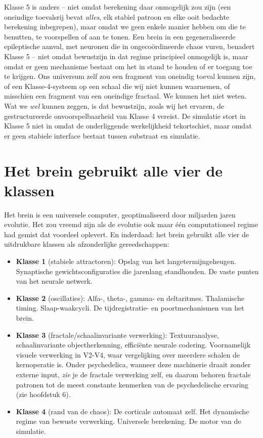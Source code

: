 \documentclass[11pt, twoside, openright]{book}
\begin{document}
Klasse 5 is anders -- niet omdat berekening daar onmogelijk zou zijn (een oneindige toevalsrij bevat \textit{alles}, elk stabiel patroon en elke ooit bedachte berekening inbegrepen), maar omdat we geen enkele manier hebben om die te benutten, te voorspellen of aan te tonen. Een brein in een gegeneraliseerde epileptische aanval, met neuronen die in ongecoördineerde chaos vuren, benadert Klasse 5 -- niet omdat bewustzijn in dat regime principieel onmogelijk is, maar omdat er geen mechanisme bestaat om het in stand te houden of er toegang toe te krijgen. Ons universum zelf zou een fragment van oneindig toeval kunnen zijn, of een Klasse-4-systeem op een schaal die wij niet kunnen waarnemen, of misschien een fragment van een oneindige fractaal. We kunnen het niet weten. Wat we \textit{wel} kunnen zeggen, is dat bewustzijn, zoals wij het ervaren, de gestructureerde onvoorspelbaarheid van Klasse 4 vereist. De simulatie stort in Klasse 5 niet in omdat de onderliggende werkelijkheid tekortschiet, maar omdat er geen stabiele interface bestaat tussen substraat en simulatie.

\section*{Het brein gebruikt alle vier de klassen}

Het brein is een universele computer, geoptimaliseerd door miljarden jaren evolutie. Het zou vreemd zijn als de evolutie ook maar één computationeel regime had gemist dat voordeel oplevert. En inderdaad: het brein gebruikt alle vier de uitdrukbare klassen als afzonderlijke gereedschappen:

\begin{itemize}
  \item \textbf{Klasse 1} (stabiele attractoren): Opslag van het langetermijngeheugen. Synaptische gewichtsconfiguraties die jarenlang standhouden. De vaste punten van het neurale netwerk.
  \item \textbf{Klasse 2} (oscillaties): Alfa-, theta-, gamma- en deltaritmes. Thalamische timing. Slaap-waakcycli. De tijdregistratie- en poortmechanismen van het brein.
  \item \textbf{Klasse 3} (fractale/\allowbreak{}schaalinvariante verwerking): Textuuranalyse, schaalinvariante objectherkenning, efficiënte neurale codering. Voornamelijk visuele verwerking in V2-V4, waar vergelijking over meerdere schalen de kernoperatie is. Onder psychedelica, wanneer deze machinerie draait zonder externe input, \textit{zie} je de fractale verwerking zelf, en daarom behoren fractale patronen tot de meest constante kenmerken van de psychedelische ervaring (zie hoofdstuk 6).
  \item \textbf{Klasse 4} (rand van de chaos): De corticale automaat zelf. Het dynamische regime van bewuste verwerking. Universele berekening. De motor van de simulatie.
\end{itemize}
\end{document}

